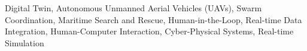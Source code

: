 \begin{IEEEkeywords}
Digital Twin, Autonomous Unmanned Aerial Vehicles (UAVs), Swarm Coordination, Maritime Search and Rescue, Human-in-the-Loop, Real-time Data Integration, Human-Computer Interaction, Cyber-Physical Systems, Real-time Simulation
\end{IEEEkeywords}
